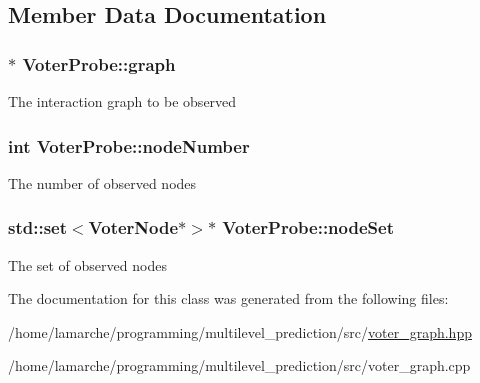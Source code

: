 \subsection{Member Data Documentation}
\hypertarget{class_voter_probe_add099ac2ac20a5f6a0e3616e78639497}{
\subsubsection[{graph}]{$\ast$ Voter\-Probe\-::graph}}\label{class_voter_probe_add099ac2ac20a5f6a0e3616e78639497}
The interaction graph to be observed \hypertarget{class_voter_probe_af0a20a6fc8a68f3ace3384cbbd6aa39f}{
\subsubsection[{node\-Number}]{\setlength{\rightskip}{0pt plus 5cm}int Voter\-Probe\-::node\-Number}}\label{class_voter_probe_af0a20a6fc8a68f3ace3384cbbd6aa39f}
The number of observed nodes \hypertarget{class_voter_probe_ae51e09098a03f3e064c8a1a8182a2eeb}{
\subsubsection[{node\-Set}]{\setlength{\rightskip}{0pt plus 5cm}std\-::set$<${\bf Voter\-Node}$\ast$$>$$\ast$ Voter\-Probe\-::node\-Set}}\label{class_voter_probe_ae51e09098a03f3e064c8a1a8182a2eeb}
The set of observed nodes 

The documentation for this class was generated from the following files\-:\begin{DoxyCompactItemize}
\item 
/home/lamarche/programming/multilevel\-\_\-prediction/src/\hyperlink{voter__graph_8hpp}{voter\-\_\-graph.\-hpp}\item 
/home/lamarche/programming/multilevel\-\_\-prediction/src/voter\-\_\-graph.\-cpp\end{DoxyCompactItemize}
